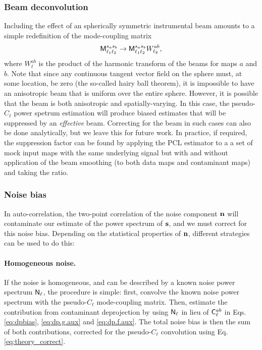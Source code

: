 \documentclass[usenatbib]{mnrasb}
\begin{document}
        \subsubsection{Beam deconvolution}\label{sssec:maths.beam_noise.beam}
          Including the effect of an spherically symmetric instrumental beam amounts to a simple redefinition of the mode-coupling matrix
          \begin{equation}
            {\sf M}^{s_as_b}_{\ell_1\ell_2}\rightarrow{\sf M}^{s_as_b}_{\ell_1\ell_2}W_{\ell_2}^{ab},
          \end{equation}
          where $W^{ab}_\ell$ is the product of the harmonic transform of the beams for maps $a$ and $b$. Note that since any continuous tangent vector field on the sphere must, at some location, be zero (the so-called hairy ball theorem), it is impossible to have an anisotropic beam that is uniform over the entire sphere.  However, it is possible that the beam is both anisotropic and spatially-varying. In this case, the pseudo-$C_\ell$ power spetrum estimation will produce biased estimates that will be suppressed by an \emph{effective} beam. Correcting for the beam in such cases can also be done analytically, but we leave this for future work.  In practice, if required, the
          suppression factor can be found by applying the PCL estimator to a a set of mock input maps with the same underlying signal but  with and without application of the beam smoothing (to both data maps and contaminant maps) and taking the ratio.

        \subsubsection{Noise bias}
         In auto-correlation, the two-point correlation of the noise component ${\bf n}$ will contaminate our estimate of the power spectrum of ${\bf s}$, and we must correct for this noise bias. Depending on the statistical properties of ${\bf n}$, different strategies can be used to do this:
         \paragraph*{Homogeneous noise.}
           If the noise is homogeneous, and can be described by a known noise power spectrum ${\sf N}_\ell$, the procedure is simple: first, convolve the known noise power spectrum with the pseudo-$C_\ell$ mode-coupling matrix. Then, estimate the contribution from contaminant deprojection by using ${\sf N}_\ell$ in lieu of ${\sf C}^{ab}_\ell$ in Eqs. \ref{eq:dpbias}, \ref{eq:dp.g.aux} and \ref{eq:dp.f.aux}. The total noise bias is then the sum of both contributions, corrected for the pseudo-$C_\ell$ convolution using Eq. \ref{eq:theory_correct}.
          
\end{document}
